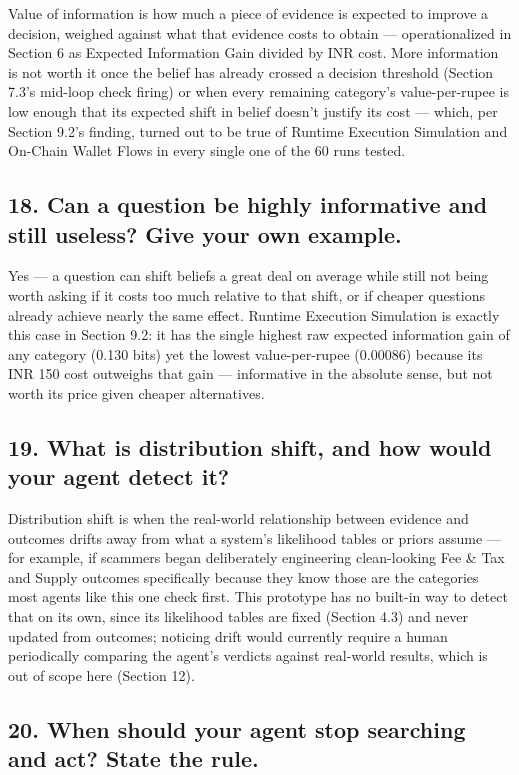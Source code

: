 \documentclass[11pt]{article}
\begin{document}
Value of information is how much a piece of evidence is expected to improve a decision, weighed against what that evidence costs to obtain --- operationalized in Section 6 as Expected Information Gain divided by INR cost. More information is not worth it once the belief has already crossed a decision threshold (Section 7.3's mid-loop check firing) or when every remaining category's value-per-rupee is low enough that its expected shift in belief doesn't justify its cost --- which, per Section 9.2's finding, turned out to be true of Runtime Execution Simulation and On-Chain Wallet Flows in every single one of the 60 runs tested.

\subsection*{18. Can a question be highly informative and still useless? Give your own example.}

Yes --- a question can shift beliefs a great deal on average while still not being worth asking if it costs too much relative to that shift, or if cheaper questions already achieve nearly the same effect. Runtime Execution Simulation is exactly this case in Section 9.2: it has the single highest raw expected information gain of any category (0.130 bits) yet the lowest value-per-rupee (0.00086) because its INR 150 cost outweighs that gain --- informative in the absolute sense, but not worth its price given cheaper alternatives.

\subsection*{19. What is distribution shift, and how would your agent detect it?}

Distribution shift is when the real-world relationship between evidence and outcomes drifts away from what a system's likelihood tables or priors assume --- for example, if scammers began deliberately engineering clean-looking Fee \& Tax and Supply outcomes specifically because they know those are the categories most agents like this one check first. This prototype has no built-in way to detect that on its own, since its likelihood tables are fixed (Section 4.3) and never updated from outcomes; noticing drift would currently require a human periodically comparing the agent's verdicts against real-world results, which is out of scope here (Section 12).

\subsection*{20. When should your agent stop searching and act? State the rule.}
\end{document}

